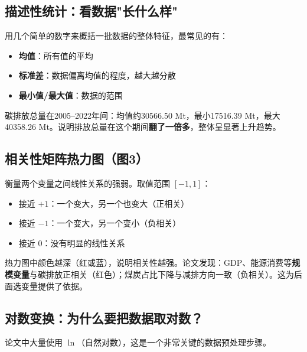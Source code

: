 \documentclass[12pt, a4paper]{article}
\begin{document}
\subsection{描述性统计：看数据"长什么样"}

\begin{conceptbox}[描述性统计]
用几个简单的数字来概括一批数据的整体特征，最常见的有：
\begin{itemize}[leftmargin=2em]
\item \textbf{均值}：所有值的平均
\item \textbf{标准差}：数据偏离均值的程度，越大越分散
\item \textbf{最小值/最大值}：数据的范围
\end{itemize}
\end{conceptbox}

\begin{examplebox}[论文中的描述性统计]
碳排放总量在2005--2022年间：均值约30566.50 Mt，最小17516.39 Mt，最大40358.26 Mt。说明排放总量在这个期间\textbf{翻了一倍多}，整体呈显著上升趋势。
\end{examplebox}

\subsection{相关性矩阵热力图（图3）}

\begin{conceptbox}[相关系数]
衡量两个变量之间线性关系的强弱。取值范围 $[-1, 1]$：
\begin{itemize}[leftmargin=2em]
\item 接近 $+1$：一个变大，另一个也变大（正相关）
\item 接近 $-1$：一个变大，另一个变小（负相关）
\item 接近 $0$：没有明显的线性关系
\end{itemize}
\end{conceptbox}

\begin{tipbox}
热力图中颜色越深（红或蓝），说明相关性越强。论文发现：GDP、能源消费等\textbf{规模变量}与碳排放正相关（红色）；煤炭占比下降与减排方向一致（负相关）。这为后面选变量提供了依据。
\end{tipbox}

\subsection{对数变换：为什么要把数据取对数？}

论文中大量使用 $\ln$（自然对数），这是一个非常关键的数据预处理步骤。
\end{document}
